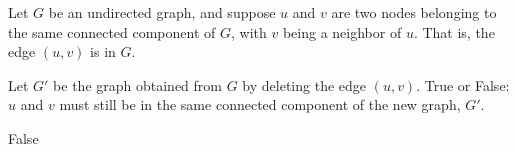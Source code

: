 \begin{prob}
    Let $G$ be an undirected graph, and suppose $u$ and $v$ are two nodes belonging to the
    same connected component of $G$, with $v$ being a neighbor of $u$. That is, the edge $(u, v)$
    is in $G$.

    Let $G'$ be the graph obtained from $G$ by deleting the edge $(u, v)$. True or False:
    $u$ and $v$ must still be in the same connected component of the new graph, $G'$.

    \tF{}

    \begin{soln}
        False
    \end{soln}

\end{prob}
